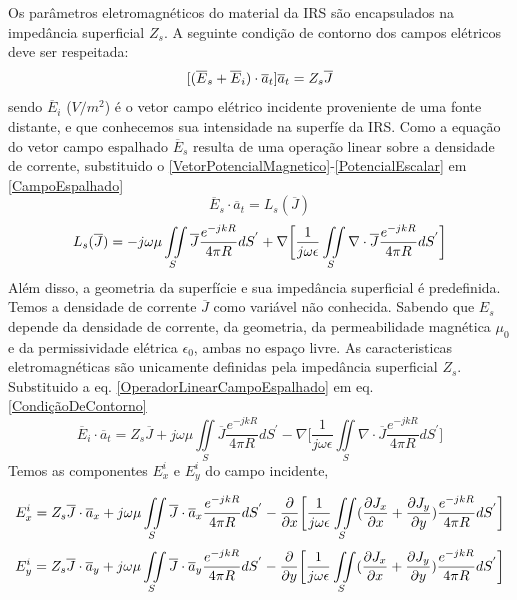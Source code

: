 \documentclass[
	12pt,				%
	openright,			%
	oneside,			%
	a4paper,			%
	english,			%
	brazil				%
	]{abntex2}
\begin{document}
Os parâmetros eletromagnéticos do material da IRS são encapsulados na impedância superficial $Z_s$. A seguinte condição de contorno dos campos elétricos deve ser respeitada:
  \begin{equation}{\label{CondiçãoDeContorno}}
    [(\overline{E}_s+\overline{E}_{i})\cdot \overline{a}_t]\overline{a}_t=Z_s\overline{J}
  \end{equation}
sendo $\overline{E}_i$ ($V/m^2$) é o vetor campo elétrico incidente proveniente de uma fonte distante, e que conhecemos sua intensidade na superfíe da IRS. Como a equação do vetor campo espalhado $\overline{E}_s$ resulta de uma operação linear  sobre a densidade de corrente, substituido o \ref{VetorPotencialMagnetico}-\ref{PotencialEscalar} em \ref{CampoEspalhado}
\begin{equation}
    \overline{E}_s \cdot \overline{a}_t=L_s(\overline{J})
\end{equation}
  \begin{equation}{\label{OperadorLinearCampoEspalhado}}
      L_s(\overline{J})= -j\omega \mu \iint\limits_S\overline{J} \frac{e^{-j k R}}{4 \pi R} dS^{'} +
    \nabla \biggl[ \frac{1}{j\omega \epsilon}\iint\limits_S \nabla \cdot \overline{J}\frac{e^{-j k R}}{4 \pi R} dS^{'}  \biggl] 
  \end{equation}
Além disso, a geometria da superfície e sua impedância superficial é predefinida. Temos a densidade de corrente $\overline{J}$ como variável não conhecida. Sabendo que $E_s$ depende da densidade de corrente, da geometria,  da permeabilidade magnética  $\mu_0$ e da permissividade elétrica $\epsilon_0$, ambas no espaço livre. As caracteristicas eletromagnéticas são unicamente definidas pela impedância superficial $Z_s$. Substituido a eq. \ref{OperadorLinearCampoEspalhado} em eq. \ref{CondiçãoDeContorno}
\begin{equation}
\overline{E}_{i}\cdot \overline{a}_t=Z_s\overline{J}+j\omega \mu \iint\limits_S\overline{J} \frac{e^{-j k R}}{4 \pi R} dS^{'} -
    \nabla \biggl[ \frac{1}{j\omega \epsilon}\iint\limits_S \nabla \cdot \overline{J}\frac{e^{-j k R}}{4 \pi R} dS^{'}  \biggl] 
\end{equation}
Temos as componentes $E_x^{i}$ e $E_y^{i}$ do campo incidente,

\begin{equation}{\label{CampoExTangencialEmFunçãoJ}}
  E_{x}^i=Z_s \overline{J}\cdot \overline{a}_x+j\omega \mu \iint\limits_S \overline{J}\cdot \overline{a}_x\frac{e^{-j k R}}{4 \pi R} dS^{'} -
     \frac{\partial }{\partial x}  \biggl[ \frac{1}{j\omega \epsilon}\iint\limits_S  (\frac{\partial J_x}{\partial x}+ \frac{\partial J_y}{\partial y} ) \frac{e^{-j k R}}{4 \pi R} dS^{'}  \biggl] 
\end{equation}
\begin{equation}{\label{CampoEyTangencialEmFunçãoJ}}
  E_{y}^i=Z_s \overline{J}\cdot \overline{a}_y+j\omega \mu \iint\limits_S \overline{J}\cdot \overline{a}_y \frac{e^{-j k R}}{4 \pi R} dS^{'} -
     \frac{\partial }{\partial y}  \biggl[ \frac{1}{j\omega \epsilon}\iint\limits_S  (\frac{\partial J_x}{\partial x}+ \frac{\partial J_y}{\partial y} ) \frac{e^{-j k R}}{4 \pi R} dS^{'}  \biggl] 
\end{equation}
\end{document}
